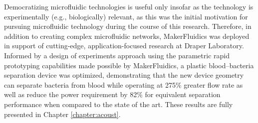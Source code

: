 Democratizing microfluidic technologies is useful only insofar as the technology is experimentally (e.g., biologically) relevant, as this was the initial motivation for pursuing microfluidic technology during the course of this research. Therefore, in addition to creating complex microfluidic networks, MakerFluidics was deployed in support of cutting-edge, application-focused research at Draper Laboratory. Informed by a design of experiments approach using the parametric rapid prototyping capabilities made possible by MakerFluidics, a plastic blood--bacteria separation device was optimized, demonstrating that the new device geometry can separate bacteria from blood while operating at 275\% greater flow rate as well as reduce the power requirement by 82\% for equivalent separation performance when compared to the state of the art. These results are fully presented in Chapter \ref{chapter:acoust}.








